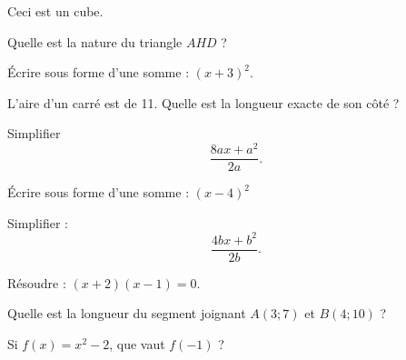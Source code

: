 \begin{MentalActivity}

\begin{mental}

    Ceci est un cube.
                
                
                
                Quelle est la nature du triangle \( AHD\) ?



\end{mental}

\begin{mental}
            Écrire sous forme d'une somme : $(x+3)^2$.
\end{mental}

\begin{mental}
            L'aire d'un carré est de \unit{11}{\centi\meter\squared}. Quelle est la longueur exacte de son côté ?
\end{mental}

\begin{mental}
            Simplifier 
            \begin{equation*}
                \frac{ 8ax+a^2 }{ 2a }.
            \end{equation*}
            

\end{mental}


\end{MentalActivity}
\begin{MentalActivity}

\begin{mental}
            Écrire sous forme d'une somme : \( (x-4)^2\)

\end{mental}

\begin{mental}
            Simplifier :
            \begin{equation*}
                \frac{ 4bx+b^2 }{ 2b }.
            \end{equation*}
\end{mental}

\begin{mental}

            Résoudre : \( (x+2)(x-1)=0\).

\end{mental}

\begin{mental}
            Quelle est la longueur du segment joignant \( A(3;7)\) et \( B(4;10)\) ?
\end{mental}

\begin{mental}
            Si \( f(x)=x^2-2\), que vaut \( f(-1)\) ?
            

    

\end{mental}


\end{MentalActivity}
